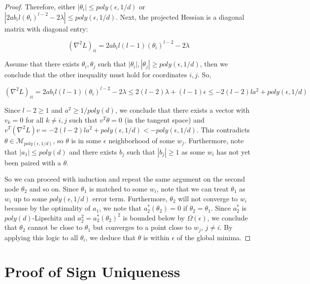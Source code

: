 \documentclass[11pt]{article}
\begin{document}
\begin{proof}
Therefore, either $|\theta_i| \leq poly(\epsilon,1/d)$ or $|2ab_il(\theta_i)^{l-2} - 2 \lambda |\leq poly(\epsilon,1/d)$. Next, the projected Hessian is a diagonal matrix with diagonal entry: 

\[(\nabla^2 L)_{ii} = 2a b_i l(l-1)(\theta_i)^{l-2} - 2 \lambda\]

Assume that there exists $\theta_i, \theta_j$ such that $|\theta_i|,|\theta_j| \geq poly(\epsilon,1/d)$, then we conclude that the other inequality must hold for coordinates $i, j$. So,

\[(\nabla^2 L)_{ii} = 2a b_i l(l-1)(\theta_i)^{l-2} - 2 \lambda \leq 2(l-2)\lambda + (l-1)\epsilon \leq -2(l-2)la^2 + poly(\epsilon,1/d)\]

Since $l-2 \geq 1$ and $a^2 \geq 1/poly(d)$, we conclude that there exists a vector with $v_k = 0$ for all $k\neq i, j$ such that $v^T\theta = 0$ (in the tangent space) and $v^T(\nabla^2 L) v  = -2(l-2)l a^2 + poly(\epsilon,1/d) < -poly(\epsilon,1/d)$. This contradicts $\theta \in \mathcal{M}_{poly(\epsilon,1/d)}$, so $\theta$ is in some $\epsilon$ neighborhood of some $w_j$. Furthermore, note that $|a_1| \leq poly(d)$ and there exists $b_j$ such that $|b_j| \geq 1$ as some $w_i$ has not yet been paired with a $\theta$.

So we can proceed with induction and repeat the same argument on the second node $\theta_2$ and so on. Since $\theta_1$ is matched to some $w_i$, note that we can treat $\theta_1$ as $w_i$ up to some $poly(\epsilon,1/d)$ error term. Furthermore, $\theta_2$ will not converge to $w_i$ because by the optimality of $a_1$, we note that $a_2^*(\theta_2) = 0$ if $\theta_2 =\theta_1$. Since $a_2^*$ is $poly(d)$-Lipschitz and $a_2^2 = a_2^*(\theta_2)^2$ is bounded below by $\Omega(\epsilon)$, we conclude that $\theta_2$ cannot be close to $\theta_1$ but converges to a point close to $w_{j}$, $j\neq i$. By applying this logic to all $\theta_i$, we deduce that $\theta$ is within $\epsilon$ of the global minima.

\end{proof}


\section{Proof of Sign Uniqueness}


\signUnique*
\end{document}
